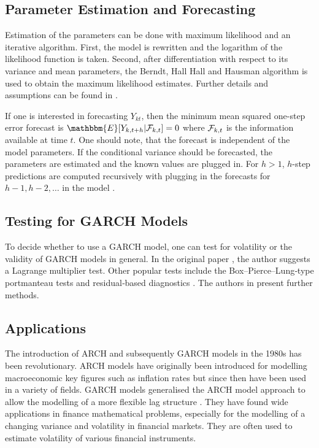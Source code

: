\subsection{Parameter Estimation and Forecasting}
\label{sec: GARCH Parameter Estimation and Forecasting}

Estimation of the parameters can be done with maximum likelihood and an iterative algorithm. First, the model is rewritten and the logarithm of the likelihood function is taken. Second, after differentiation with respect to its variance and mean parameters, the Berndt, Hall Hall and Hausman algorithm \textcite{Berndt:1974}is used to obtain the maximum likelihood estimates. Further details and assumptions can be found in \textcite{Bollerslev:1986}. 

If one is interested in forecasting $Y_{kt}$, then the minimum mean squared one-step error forecast is $\mathbbm{E}[Y_{k,t+h}|\SigA_{k,t}]=0$ where $\mathcal{F}_{k,t}$ is the information available at time $t$. One should note, that the forecast is independent of the model parameters. If the conditional variance should be forecasted, the parameters are estimated and the known values are plugged in. For $h>1$, $h$-step predictions are computed recursively with plugging in the forecasts for $h-1,h-2,\ldots$ in the model \textcite{Zivot:2009}. 


\subsection{Testing for GARCH Models}
\label{sec: Testing for GARCH models}

To decide whether to use a GARCH model, one can test for volatility or the validity of GARCH models in general. In the original paper \textcite{Bollerslev:1986}, the author suggests a Lagrange multiplier test. Other popular tests include the Box–Pierce–Lung‐type portmanteau tests and residual‐based diagnostics \textcite{Hong:2017}. The authors in \textcite{Hong:2017} present further methods. 


\subsection{Applications}
\label{sec: Garch Applications}

The introduction of ARCH and subsequently GARCH models in the 1980s has been revolutionary. ARCH models have originally been introduced for modelling macroeconomic key figures such as inflation rates but since then have been used in a variety of fields. GARCH models generalised the ARCH model approach to allow the modelling of a more flexible lag structure \textcite{Bollerslev:1986}. They have found wide applications in finance mathematical problems, especially for the modelling of a changing variance and volatility in financial markets. They are often used to estimate volatility of various financial instruments. 

